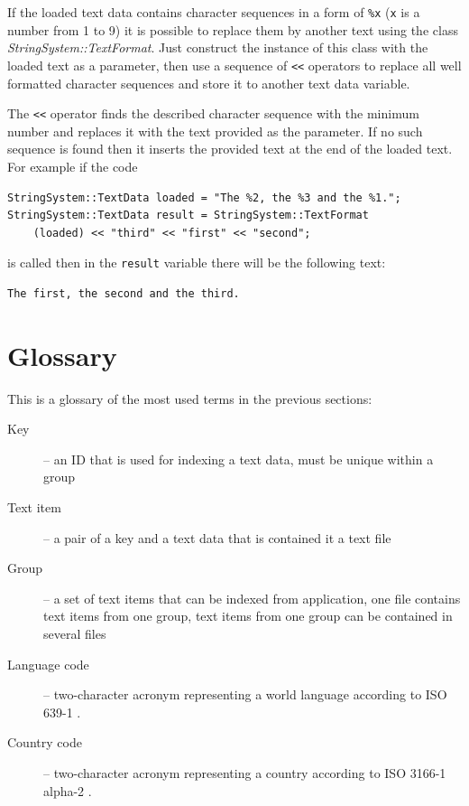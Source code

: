 \documentclass[a4paper, 12pt]{report}
\begin{document}
If the loaded text data contains character sequences in a form of \verb/%x/ (\verb/x/ is a number from 1 to 9) it is possible to replace them by another text using the class \emph{StringSystem::TextFormat}. Just construct the instance of this class with the loaded text as a parameter, then use a sequence of \verb/<</ operators to replace all well formatted character sequences and store it to another text data variable.

The \verb/<</ operator finds the described character sequence with the minimum number and replaces it with the text provided as the parameter. If no such sequence is found then it inserts the provided text at the end of the loaded text. For example if the code

\begin{verbatim}
StringSystem::TextData loaded = "The %2, the %3 and the %1.";
StringSystem::TextData result = StringSystem::TextFormat
    (loaded) << "third" << "first" << "second";
\end{verbatim}

\noindent is called then in the \verb/result/ variable there will be the following text:

\begin{verbatim}
The first, the second and the third.
\end{verbatim}


\section{Glossary}
This is a glossary of the most used terms in the previous sections:

\begin{description}
  \item[Key] -- an ID that is used for indexing a text data, must be unique within a group
  \item[Text item] -- a pair of a key and a text data that is contained it a text file
  \item[Group] -- a set of text items that can be indexed from application, one file contains text items from one group, text items from one group can be contained in several files
  \item[Language code] -- two-character acronym representing a world language according to ISO 639-1 \cite{ISO-639-1}.
  \item[Country code] -- two-character acronym representing a country according to ISO 3166-1 alpha-2 \cite{ISO-3166-1}.
\end{description}
\end{document}
